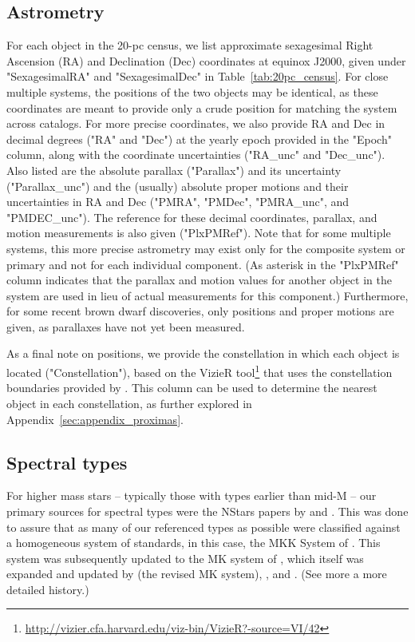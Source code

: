 \documentclass[twocolumn,tighten,twocolappendix]{aastex631}
\begin{document}
\pagebreak

\subsection{Astrometry\label{sec:astrometry}}

For each object in the 20-pc census, we list approximate sexagesimal Right Ascension (RA) and Declination (Dec) coordinates at equinox J2000, given under "SexagesimalRA" and "SexagesimalDec" in Table~\ref{tab:20pc_census}. For close multiple systems, the positions of the two objects may be identical, as these coordinates are meant to provide only a crude position for matching the system across catalogs. For more precise coordinates, we also provide RA and Dec in decimal degrees ("RA" and "Dec") at the yearly epoch provided in the "Epoch" column, along with the coordinate uncertainties ("RA\_unc" and "Dec\_unc"). Also listed are the absolute parallax ("Parallax") and its uncertainty ("Parallax\_unc") and the (usually) absolute proper motions and their uncertainties in RA and Dec ("PMRA", "PMDec", "PMRA\_unc", and "PMDEC\_unc"). The reference for these decimal coordinates, parallax, and motion measurements is also given ("PlxPMRef"). Note that for some multiple systems, this more precise astrometry may exist only for the composite system or primary and not for each individual component. (As asterisk in the "PlxPMRef" column indicates that the parallax and motion values for another object in the system are used in lieu of actual measurements for this component.) Furthermore, for some recent brown dwarf discoveries, only positions and proper motions are given, as parallaxes have not yet been measured.

As a final note on positions, we provide the constellation in which each object is located ("Constellation"), based on the VizieR tool\footnote{\url {http://vizier.cfa.harvard.edu/viz-bin/VizieR?-source=VI/42}} that uses the constellation boundaries provided by \cite{roman1987}. This column can be used to determine the nearest object in each constellation, as further explored in Appendix~\ref{sec:appendix_proximas}.

\subsection{Spectral types\label{sec:spectral_types}}

For higher mass stars -- typically those with types earlier than mid-M -- our primary sources for spectral types were the NStars papers by \cite{gray2003} and \cite{gray2006}. This was done to assure that as many of our referenced types as possible were classified against a homogeneous system of standards, in this case, the MKK System of \cite{morgan1943}. This system was subsequently updated to the MK system of \cite{johnson1953}, which itself was expanded and updated by \cite{morgan1973} (the revised MK system), \cite{keenan1976}, and \cite{morgan1978}. (See \citealt{hearnshaw2014} more a more detailed history.) 
\end{document}
